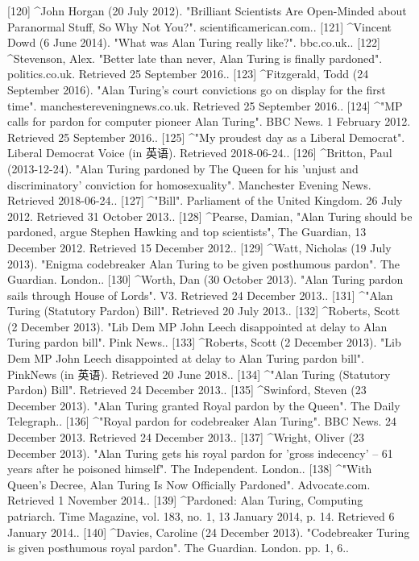 [120]
^John Horgan (20 July 2012). "Brilliant Scientists Are Open-Minded about Paranormal Stuff, So Why Not You?". scientificamerican.com..
[121]
^Vincent Dowd (6 June 2014). "What was Alan Turing really like?". bbc.co.uk..
[122]
^Stevenson, Alex. "Better late than never, Alan Turing is finally pardoned". politics.co.uk. Retrieved 25 September 2016..
[123]
^Fitzgerald, Todd (24 September 2016). "Alan Turing's court convictions go on display for the first time". manchestereveningnews.co.uk. Retrieved 25 September 2016..
[124]
^"MP calls for pardon for computer pioneer Alan Turing". BBC News. 1 February 2012. Retrieved 25 September 2016..
[125]
^"My proudest day as a Liberal Democrat". Liberal Democrat Voice (in 英语). Retrieved 2018-06-24..
[126]
^Britton, Paul (2013-12-24). "Alan Turing pardoned by The Queen for his 'unjust and discriminatory' conviction for homosexuality". Manchester Evening News. Retrieved 2018-06-24..
[127]
^"Bill". Parliament of the United Kingdom. 26 July 2012. Retrieved 31 October 2013..
[128]
^Pearse, Damian, "Alan Turing should be pardoned, argue Stephen Hawking and top scientists", The Guardian, 13 December 2012. Retrieved 15 December 2012..
[129]
^Watt, Nicholas (19 July 2013). "Enigma codebreaker Alan Turing to be given posthumous pardon". The Guardian. London..
[130]
^Worth, Dan (30 October 2013). "Alan Turing pardon sails through House of Lords". V3. Retrieved 24 December 2013..
[131]
^"Alan Turing (Statutory Pardon) Bill". Retrieved 20 July 2013..
[132]
^Roberts, Scott (2 December 2013). "Lib Dem MP John Leech disappointed at delay to Alan Turing pardon bill". Pink News..
[133]
^Roberts, Scott (2 December 2013). "Lib Dem MP John Leech disappointed at delay to Alan Turing pardon bill". PinkNews (in 英语). Retrieved 20 June 2018..
[134]
^"Alan Turing (Statutory Pardon) Bill". Retrieved 24 December 2013..
[135]
^Swinford, Steven (23 December 2013). "Alan Turing granted Royal pardon by the Queen". The Daily Telegraph..
[136]
^"Royal pardon for codebreaker Alan Turing". BBC News. 24 December 2013. Retrieved 24 December 2013..
[137]
^Wright, Oliver (23 December 2013). "Alan Turing gets his royal pardon for 'gross indecency' – 61 years after he poisoned himself". The Independent. London..
[138]
^"With Queen's Decree, Alan Turing Is Now Officially Pardoned". Advocate.com. Retrieved 1 November 2014..
[139]
^Pardoned: Alan Turing, Computing patriarch. Time Magazine, vol. 183, no. 1, 13 January 2014, p. 14. Retrieved 6 January 2014..
[140]
^Davies, Caroline (24 December 2013). "Codebreaker Turing is given posthumous royal pardon". The Guardian. London. pp. 1, 6..
